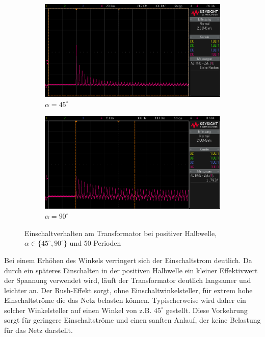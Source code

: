 \documentclass{article}
\begin{document}
\begin{figure}[h]
  \centering
  \begin{subfigure}{.45\textwidth}
    \centering
    \includegraphics[width=\linewidth]{../assets/images/gep3/einschalt_45deg.png}
    \caption{$\alpha = 45^{\circ}$}
  \end{subfigure}
  \begin{subfigure}{.45\textwidth}
    \centering
    \includegraphics[width=\linewidth]{../assets/images/gep3/einschalt_90deg.png}
    \caption{$\alpha = 90^{\circ}$}
  \end{subfigure}
  \label{fig:31_242}
  \caption{Einschaltverhalten am Transformator bei positiver Halbwelle, $\alpha \in \{45^{\circ}, 90^{\circ}\}$ und 50 Perioden}
\end{figure}

 Bei einem Erhöhen des Winkels verringert sich der Einschaltstrom deutlich. Da durch ein späteres Einschalten in der positiven Halbwelle ein kleiner Effektivwert der Spannung verwendet wird, läuft der Transformator deutlich langsamer und leichter an. Der Rush-Effekt sorgt, ohne Einschaltwinkelsteller, für extrem hohe Einschaltströme die das Netz belasten können. Typischerweise wird daher ein solcher Winkelsteller auf einen Winkel von z.B. $45^{\circ}$ gestellt. Diese Vorkehrung sorgt für geringere Einschaltströme und einen sanften Anlauf, der keine Belastung für das Netz darstellt.
\end{document}
